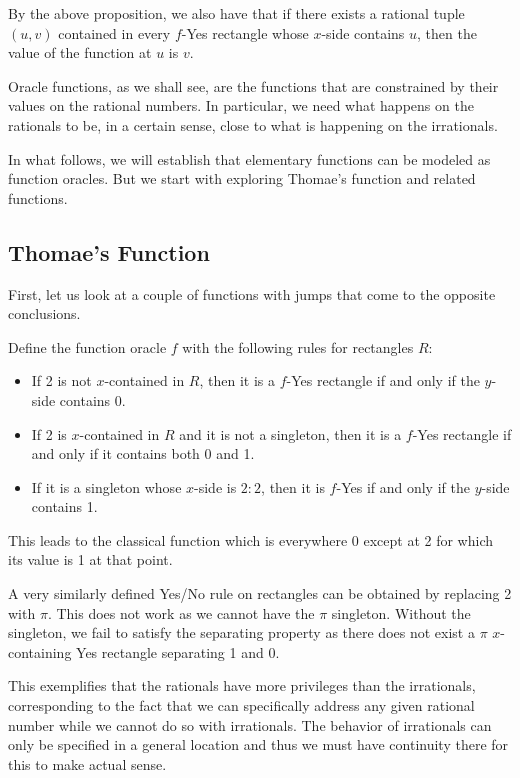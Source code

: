 \documentclass[12pt]{article}
\theoremstyle{remark}
\begin{document}
By the above proposition, we also have that if there exists a rational tuple $(u,v)$ contained in every $f$-Yes rectangle whose $x$-side contains $u$, then the value of the function at $u$ is $v$.


Oracle functions, as we shall see, are the functions that are constrained by their values on the rational numbers. In particular, we need what happens on the rationals to be, in a certain sense, close to what is happening on the irrationals. 

In what follows, we will establish that elementary functions can be modeled as function oracles. But we start with exploring Thomae's function and related functions.


\subsection{Thomae's Function}

First, let us look at a couple of functions with jumps that come to the opposite conclusions. 

Define the function oracle $f$ with the following rules for rectangles $R$: 

\begin{itemize}
    \item If 2 is not $x$-contained in $R$, then it is a $f$-Yes rectangle if and only if the $y$-side contains 0. 
    \item If 2 is $x$-contained in $R$ and it is not a singleton, then it is a $f$-Yes rectangle if and only if it contains both 0 and 1.
    \item If it is a singleton whose $x$-side is $2:2$, then it is $f$-Yes if and only if the $y$-side contains 1. 
\end{itemize}

This leads to the classical function which is everywhere 0 except at 2 for which its value is 1 at that point. 

A very similarly defined Yes/No rule on rectangles can be obtained by replacing 2 with $\pi$. This does not work as we cannot have the $\pi$ singleton. Without the singleton, we fail to satisfy the separating property as there does not exist a $\pi$ $x$-containing Yes rectangle separating 1 and 0.  

This exemplifies that the rationals have more privileges than the irrationals, corresponding to the fact that we can specifically address any given rational number while we cannot do so with irrationals. The behavior of irrationals can only be specified in a general location and thus we must have continuity there for this to make actual sense. 
\end{document}
